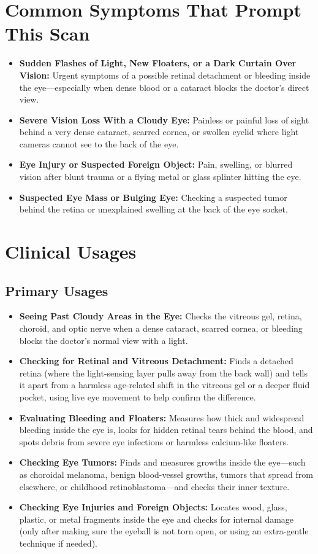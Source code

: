 \section{Common Symptoms That Prompt This Scan}
\begin{itemize}
    \item \textbf{Sudden Flashes of Light, New Floaters, or a Dark Curtain Over Vision:} Urgent symptoms of a possible retinal detachment or bleeding inside the eye---especially when dense blood or a cataract blocks the doctor's direct view.
    \item \textbf{Severe Vision Loss With a Cloudy Eye:} Painless or painful loss of sight behind a very dense cataract, scarred cornea, or swollen eyelid where light cameras cannot see to the back of the eye.
    \item \textbf{Eye Injury or Suspected Foreign Object:} Pain, swelling, or blurred vision after blunt trauma or a flying metal or glass splinter hitting the eye.
    \item \textbf{Suspected Eye Mass or Bulging Eye:} Checking a suspected tumor behind the retina or unexplained swelling at the back of the eye socket.
\end{itemize}

\section{Clinical Usages}

\subsection{Primary Usages}
\begin{itemize}
    \item \textbf{Seeing Past Cloudy Areas in the Eye:} Checks the vitreous gel, retina, choroid, and optic nerve when a dense cataract, scarred cornea, or bleeding blocks the doctor's normal view with a light.
    \item \textbf{Checking for Retinal and Vitreous Detachment:} Finds a detached retina (where the light-sensing layer pulls away from the back wall) and tells it apart from a harmless age-related shift in the vitreous gel or a deeper fluid pocket, using live eye movement to help confirm the difference.
    \item \textbf{Evaluating Bleeding and Floaters:} Measures how thick and widespread bleeding inside the eye is, looks for hidden retinal tears behind the blood, and spots debris from severe eye infections or harmless calcium-like floaters.
    \item \textbf{Checking Eye Tumors:} Finds and measures growths inside the eye---such as choroidal melanoma, benign blood-vessel growths, tumors that spread from elsewhere, or childhood retinoblastoma---and checks their inner texture.
    \item \textbf{Checking Eye Injuries and Foreign Objects:} Locates wood, glass, plastic, or metal fragments inside the eye and checks for internal damage (only after making sure the eyeball is not torn open, or using an extra-gentle technique if needed).
\end{itemize}

